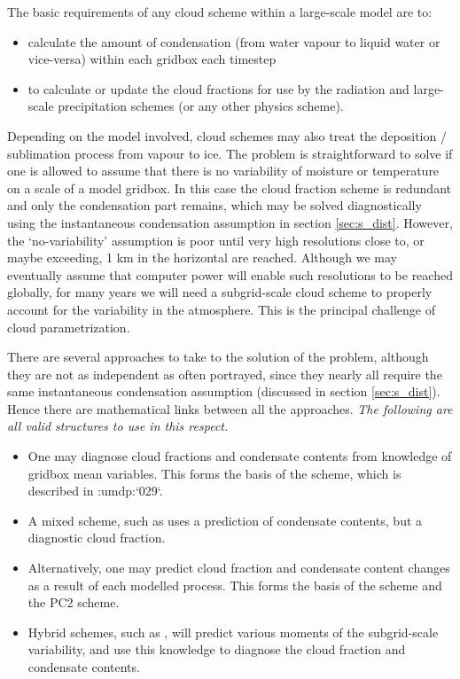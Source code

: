 \documentclass{UMDP_article}
\newcommand{\citeumdp}[1]{:umdp:`#1`}
\begin{document}
The basic requirements of any cloud scheme within a large-scale model are to:
\begin{itemize}
\item{calculate the amount of condensation (from water vapour to liquid water or vice-versa) within each gridbox each timestep}
\item{to calculate or update the cloud fractions for use by the radiation and large-scale precipitation schemes (or any other physics scheme).}
\end{itemize}

Depending on the model involved, cloud schemes may also treat the
deposition / sublimation process from vapour to ice. The problem is
straightforward to solve if one is allowed to assume that there is no
variability of moisture or temperature on a scale of a model gridbox. 
In this case the cloud fraction scheme is redundant and only the condensation
part remains, which may be solved diagnostically using the instantaneous
condensation assumption in section \ref{sec:s_dist}. However, the
`no-variability' assumption is poor until
very high resolutions close to, or maybe exceeding, 1 km in the horizontal
are reached. Although we may eventually assume that computer power
will enable such resolutions to be reached globally, for many years we
will need a subgrid-scale cloud scheme to properly account for the
variability in the atmosphere. This is the principal challenge of
cloud parametrization.

There are several approaches to take to the solution of the problem,
although they are not as independent as often portrayed, since they
nearly all require the same instantaneous condensation assumption
(discussed in section \ref{sec:s_dist}). Hence there are mathematical
links between
all the approaches. \textit{The following are all valid structures
to use in this respect.}
\begin{itemize}
\item{One may diagnose cloud fractions and condensate contents from knowledge of gridbox mean variables. This forms the basis of the \cite{smith90} scheme, which is described in
\citeumdp{029}.} 
\item{A mixed scheme, such as \cite{sundqvist1978} uses a prediction of condensate contents, but a diagnostic cloud fraction.}
\item{Alternatively, one may predict cloud fraction and condensate content changes as a result of each modelled process. This forms the basis of the \cite{t93} scheme and the PC2 scheme.}
\item{Hybrid schemes, such as \cite{t02}, will predict various moments of the subgrid-scale variability, and use this knowledge to diagnose the cloud fraction and condensate contents.}
\end{itemize}
\end{document}
